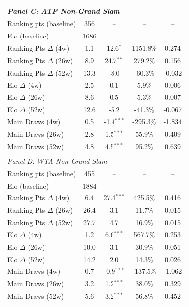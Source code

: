 \begin{tabular}{lcccc}
\\[0.5em]
\multicolumn{5}{l}{\textit{Panel C: ATP Non-Grand Slam}} \\
\midrule
Ranking pts (baseline) & 356 & -- & -- & -- \\
Elo (baseline) & 1686 & -- & -- & -- \\[0.3em]
\quad Ranking Pts $\Delta$ (4w) & 1.1 & 12.6$^{*}$ & 1151.8\% & 0.274 \\
\quad Ranking Pts $\Delta$ (26w) & 8.9 & 24.7$^{**}$ & 279.2\% & 0.156 \\
\quad Ranking Pts $\Delta$ (52w) & 13.3 & -8.0 & -60.3\% & -0.032 \\

\quad Elo $\Delta$ (4w) & 2.5 & 0.1 & 5.9\% & 0.006 \\
\quad Elo $\Delta$ (26w) & 8.6 & 0.5 & 5.3\% & 0.007 \\
\quad Elo $\Delta$ (52w) & 12.6 & -5.2 & -41.3\% & -0.067 \\

\quad Main Draws (4w) & 0.5 & -1.4$^{***}$ & -295.3\% & -1.834 \\
\quad Main Draws (26w) & 2.8 & 1.5$^{***}$ & 55.9\% & 0.409 \\
\quad Main Draws (52w) & 4.8 & 4.5$^{***}$ & 95.2\% & 0.639 \\

\\[0.5em]
\multicolumn{5}{l}{\textit{Panel D: WTA Non-Grand Slam}} \\
\midrule
Ranking pts (baseline) & 455 & -- & -- & -- \\
Elo (baseline) & 1884 & -- & -- & -- \\[0.3em]
\quad Ranking Pts $\Delta$ (4w) & 6.4 & 27.4$^{***}$ & 425.5\% & 0.416 \\
\quad Ranking Pts $\Delta$ (26w) & 26.4 & 3.1 & 11.7\% & 0.015 \\
\quad Ranking Pts $\Delta$ (52w) & 27.7 & 4.7 & 16.9\% & 0.015 \\

\quad Elo $\Delta$ (4w) & 1.2 & 6.6$^{***}$ & 567.7\% & 0.253 \\
\quad Elo $\Delta$ (26w) & 10.0 & 3.1 & 30.9\% & 0.051 \\
\quad Elo $\Delta$ (52w) & 14.2 & 2.0 & 14.3\% & 0.026 \\

\quad Main Draws (4w) & 0.7 & -0.9$^{***}$ & -137.5\% & -1.062 \\
\quad Main Draws (26w) & 3.2 & 1.2$^{***}$ & 38.0\% & 0.329 \\
\quad Main Draws (52w) & 5.6 & 3.2$^{***}$ & 56.8\% & 0.452 \\

\bottomrule
\end{tabular}

